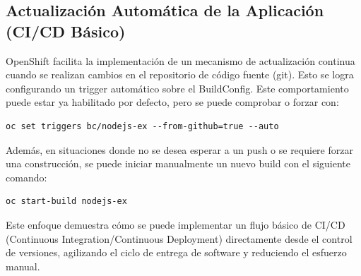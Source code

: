 \subsection{Actualización Automática de la Aplicación (CI/CD Básico)}

OpenShift facilita la implementación de un mecanismo de actualización continua cuando se realizan cambios en el repositorio de código fuente (git). Esto se logra configurando un trigger automático sobre el BuildConfig. Este comportamiento puede estar ya habilitado por defecto, pero se puede comprobar o forzar con:
\begin{verbatim}
oc set triggers bc/nodejs-ex --from-github=true --auto
\end{verbatim}

Además, en situaciones donde no se desea esperar a un push o se requiere forzar una construcción, se puede iniciar manualmente un nuevo build con el siguiente comando:
\begin{verbatim}
oc start-build nodejs-ex
\end{verbatim}

Este enfoque demuestra cómo se puede implementar un flujo básico de CI/CD (Continuous Integration/Continuous Deployment) directamente desde el control de versiones, agilizando el ciclo de entrega de software y reduciendo el esfuerzo manual.

\vspace{\baselineskip}

\newpage



